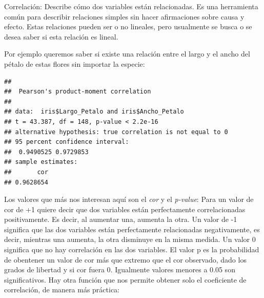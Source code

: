 \documentclass[
]{book}
\newenvironment{Shaded}{\begin{snugshade}}{\end{snugshade}}
\newcommand{\CommentTok}[1]{\textcolor[rgb]{0.56,0.35,0.01}{\textit{#1}}}
\newcommand{\FunctionTok}[1]{\textcolor[rgb]{0.13,0.29,0.53}{\textbf{#1}}}
\newcommand{\NormalTok}[1]{#1}
\newcommand{\SpecialCharTok}[1]{\textcolor[rgb]{0.81,0.36,0.00}{\textbf{#1}}}
\begin{document}
Correlación: Describe cómo dos variables están relacionadas.
Es una herramienta común para describir relaciones simples sin hacer afirmaciones sobre causa y efecto.
Estas relaciones pueden ser o no lineales, pero usualmente se busca o se desea saber si esta relación es lineal.

Por ejemplo queremos saber si existe una relación entre el largo y el ancho del pétalo de estas flores sin importar la especie:

\begin{Shaded}
\end{Shaded}

\begin{verbatim}
## 
##  Pearson's product-moment correlation
## 
## data:  iris$Largo_Petalo and iris$Ancho_Petalo
## t = 43.387, df = 148, p-value < 2.2e-16
## alternative hypothesis: true correlation is not equal to 0
## 95 percent confidence interval:
##  0.9490525 0.9729853
## sample estimates:
##       cor 
## 0.9628654
\end{verbatim}

\hfill\break
Los valores que más nos interesan aquí son el \emph{cor} y el \emph{p-value}: Para un valor de cor de +1 quiere decir que dos variables están perfectamente correlacionadas positivamente.
Es decir, al aumentar una, aumenta la otra.
Un valor de -1 significa que las dos variables están perfectamente relacionadas negativamente, es decir, mientras una aumenta, la otra disminuye en la misma medida.
Un valor 0 significa que no hay correlación en las dos variables.
El valor p es la probabilidad de obentener un valor de cor más que extremo que el cor observado, dado los grados de libertad y si cor fuera 0.
Igualmente valores menores a 0.05 son significativos.
Hay otra función que nos permite obtener solo el coeficiente de correlación, de manera más práctica:\\

\begin{Shaded}
\end{Shaded}
\end{document}

